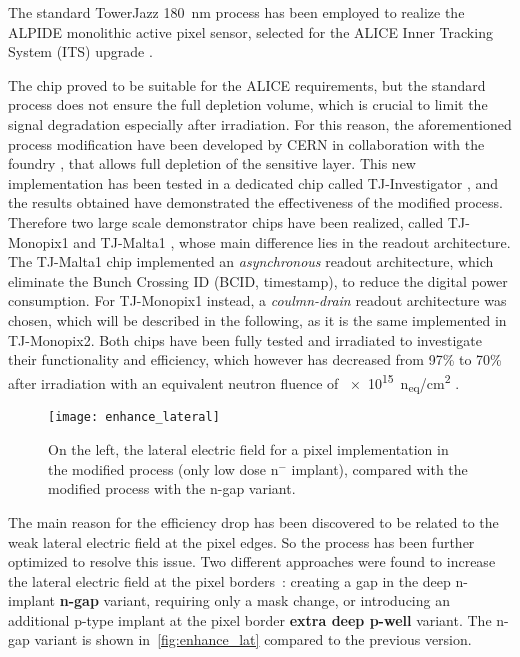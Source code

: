 The standard TowerJazz \SI{180}{nm} process has been employed to realize the ALPIDE monolithic active pixel sensor, selected for the ALICE Inner Tracking System (ITS) upgrade \cite{ALICE:2013nwm, Kim:2016ktw}.

The chip proved to be suitable for the ALICE requirements, but the standard process does not ensure the full depletion volume, which is crucial to limit the signal degradation especially after irradiation. For this reason, the aforementioned process modification have been developed by CERN in collaboration with the foundry \cite{SNOEYS201790}, that allows full depletion of the sensitive layer. This new implementation has been tested in a dedicated chip called TJ-Investigator \cite{AglieriRinella:2020rcb}, and the results obtained have demonstrated the effectiveness of the modified process. \\
Therefore two large scale demonstrator chips have been realized, called TJ-Monopix1 and TJ-Malta1 \cite{Moustakas:2017qqw}, whose main difference lies in the readout architecture. The TJ-Malta1 chip implemented an \textit{asynchronous} readout architecture, which eliminate the Bunch Crossing ID (BCID, timestamp), to reduce the digital power consumption. For TJ-Monopix1 instead, a \textit{coulmn-drain} readout architecture was chosen, which will be described in the following, as it is the same implemented in TJ-Monopix2. Both chips have been fully tested and irradiated to investigate their functionality and efficiency, which however has decreased from 97\% to 70\% after irradiation with an equivalent neutron fluence of \SI{e15}{n_{eq}/cm^{2}} \cite{Caicedo:2019lrk}. 

\begin{figure}[h!]
\centering
\texttt{[image: enhance\_lateral]}
\caption{On the left, the lateral electric field for a pixel implementation in the modified process (only low dose n$^{-}$ implant), compared with the modified process with the n-gap variant.}
\label{fig:enhance_lat}
\end{figure}


The main reason for the efficiency drop has been discovered to be related to the weak lateral electric field at the pixel edges. So the process has been further optimized to resolve this issue. Two different approaches were found to increase the lateral electric field at the pixel borders~\cite{Munker_2019}: creating a gap in the deep n-implant \textbf{n-gap} variant, requiring only a mask change, or introducing an additional p-type implant at the pixel border \textbf{extra deep p-well} variant. The n-gap variant is shown in~\autoref{fig:enhance_lat} compared to the previous version.

